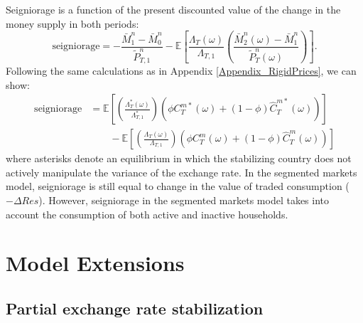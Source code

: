 Seigniorage is a function of the present discounted value of the
change in the money supply in both periods:
\begin{equation*}
  \text{seigniorage}
  = - \frac{\bar{M}^n_1 - \bar{M}^n_0}{\tilde{P}^n_{T, 1}}
  - \mathbb{E}\left[ \frac{\Lambda_T(\omega)}{\Lambda_{T, 1}}
    \left( \frac{\bar{M}^n_2(\omega) - \bar{M}^n_1}{\tilde{P}^n_T(\omega)} \right)\right].
\end{equation*}
Following the same calculations as in Appendix
\ref{Appendix_RigidPrices}, we can show:
\begin{align*}
  \text{seigniorage}
  & = \mathbb{E}\left[
    \left( \frac{\Lambda^{\ast}_T(\omega)}{\Lambda^{\ast}_{T, 1}} \right)
    \left( \phi C^{m \ast}_T(\omega) + (1 - \phi) \hat{C}^{m \ast}_T(\omega) \right)
    \right] \\
  & \quad \quad - \mathbb{E}\left[
    \left( \frac{\Lambda_T(\omega)}{\Lambda_{T, 1}} \right)
    \left( \phi C^m_T(\omega) + (1 - \phi) \hat{C}^m_T(\omega) \right)
    \right]
\end{align*}
where asterisks denote an equilibrium in which the stabilizing country
does not actively manipulate the variance of the exchange rate. In the
segmented markets model, seigniorage is still equal to change in the
value of traded consumption ($-\Delta Res$). However, seigniorage in
the segmented markets model takes into account the consumption of both
active and inactive households.


\section{Model Extensions}

\subsection{Partial exchange rate stabilization
  \label{app:partstab}}

